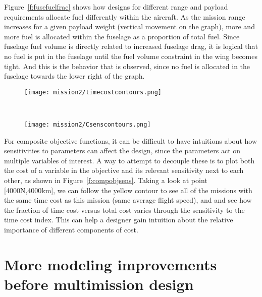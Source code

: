Figure~\ref{f:fusefuelfrac} shows how designs for different range and payload requirements
allocate fuel differently within the aircraft. As the mission range increases for a given payload weight
(vertical movement on the graph),
more and more fuel is allocated within the fuselage as a proportion of total fuel. Since fuselage fuel
volume is directly related to increased fuselage drag, it is logical that no fuel is put in the fuselage
until the fuel volume constraint in the wing becomes tight. And this is the behavior that is observed,
since no fuel is allocated in the fuselage towards the lower right of the graph.

\begin{figure*}[t!]
    \centering
    \begin{subfigure}[t]{0.5\linewidth}
        \centering
        \texttt{[image: mission2/timecostcontours.png]}
    \end{subfigure}%
    ~
    \begin{subfigure}[t]{0.5\linewidth}
        \centering
        \texttt{[image: mission2/Csenscontours.png]}
    \end{subfigure}
    \caption[Time cost and time cost index sensitivity contours.]{Time cost and time cost index sensitivity contours.
    We can gain intuition about the relative importance of different components
    of composite objectives by showing both the costs and their sensitivities together.}
    \label{f:compobjsens}
\end{figure*}

For composite objective functions, it can be difficult to have intuitions about how sensitivities
to parameters can affect the design, since the parameters act on multiple variables of interest. A way
to attempt to decouple these is to plot both the cost of a variable in the objective and its relevant
sensitivity next to each other, as shown in Figure~\ref{f:compobjsens}. Taking a look at point [4000N,4000km],
we can follow the yellow contour to see all of the missions with the same time cost as this mission
(same average flight speed), and
and see how the fraction of time cost versus total cost varies through the sensitivity to the time cost index.
This can help a designer gain intuition about the relative importance of different components of cost.

\section{More modeling improvements before multimission design}

